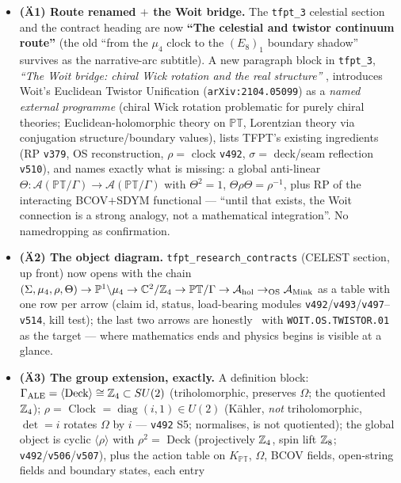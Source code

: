 \begin{itemize}[leftmargin=1.5em]
\item \textbf{(\"A1) Route renamed $+$ the Woit bridge.} The \texttt{tfpt\_3} celestial section and the
contract heading are now \textbf{``The celestial and twistor continuum route''} (the old ``from the
$\mu_4$ clock to the $(E_8)_1$ boundary shadow'' survives as the narrative-arc subtitle). A new
paragraph block in \texttt{tfpt\_3}, \emph{``The Woit bridge: chiral Wick rotation and the real
structure''} \mO, introduces Woit's Euclidean Twistor Unification (\texttt{arXiv:2104.05099}) as a
\emph{named external programme} (chiral Wick rotation problematic for purely chiral theories;
Euclidean-holomorphic theory on $\mathbb{PT}$, Lorentzian theory via conjugation
structure/boundary values), lists TFPT's existing ingredients (RP \texttt{v379}, OS reconstruction,
$\rho=$ clock \texttt{v492}, $\sigma=$ deck/seam reflection \texttt{v510}), and names exactly what
is missing: a global anti-linear $\Theta:\mathcal A(\mathbb{PT}/\Gamma)\to\mathcal
A(\mathbb{PT}/\Gamma)$ with $\Theta^2=1$, $\Theta\rho\Theta=\rho^{-1}$, plus RP of the interacting
BCOV$+$SDYM functional --- ``until that exists, the Woit connection is a strong analogy, not a
mathematical integration''. No namedropping as confirmation.
\item \textbf{(\"A2) The object diagram.} \texttt{tfpt\_research\_contracts} (CELEST section, up
front) now opens with the chain $(\Sigma,\mu_4,\rho,\Theta)\to\mathbb
P^1{\setminus}\mu_4\to\mathbb C^2/\mathbb{Z}_4\to\mathbb{PT}/\Gamma\to\mathcal
A_{\mathrm{hol}}\to_{\mathrm{OS}}\mathcal A_{\mathrm{Mink}}$ as a table with one row per arrow
(claim id, status, load-bearing modules \texttt{v492}/\texttt{v493}/\texttt{v497}--\texttt{v514},
kill test); the last two arrows are honestly \mO\ with \texttt{WOIT.OS.TWISTOR.01} as the target ---
where mathematics ends and physics begins is visible at a glance.
\item \textbf{(\"A3) The group extension, exactly.} A definition block:
$\Gamma_{\mathrm{ALE}}=\langle\text{Deck}\rangle\cong\mathbb{Z}_4\subset SU(2)$ (triholomorphic, preserves
$\Omega$; the quotiented $\mathbb{Z}_4$); $\rho=$ Clock $=\operatorname{diag}(i,1)\in U(2)$ (K\"ahler,
\emph{not} triholomorphic, $\det=i$ rotates $\Omega$ by $i$ --- \texttt{v492} S5; normalises, is not
quotiented); the global object is cyclic $\langle\rho\rangle$ with $\rho^2=$ Deck (projectively
$\mathbb{Z}_4$, spin lift $\mathbb{Z}_8$; \texttt{v492}/\texttt{v506}/\texttt{v507}), plus the action table on
$K_{\mathbb{PT}}$, $\Omega$, BCOV fields, open-string fields and boundary states, each entry \mE\

\end{itemize}
